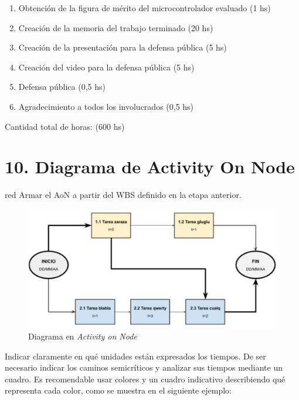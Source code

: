 \documentclass[
11pt, %
]{charter}
\begin{document}
\begin{enumerate}
\begin{enumerate}
		\item Obtención de la figura de mérito del microcontrolador evaluado (1 hs)
		\item Creación de la memoria del trabajo terminado (20 hs)
		\item Creación de la presentación para la defensa pública (5 hs)
		\item Creación del video para la defensa pública (5 hs)
		\item Defensa pública (0,5 hs)
		\item Agradecimiento a todos los involucrados (0,5 hs)
	\end{enumerate}
\end{enumerate}

Cantidad total de horas: (600 hs)

\section{10. Diagrama de Activity On Node}
\label{sec:AoN}

\begin{consigna}{red}
Armar el AoN a partir del WBS definido en la etapa anterior. 



\end{consigna}

\begin{figure}[htpb]
\centering 
\includegraphics[width=.8\textwidth]{./Figuras/AoN.png}
\caption{Diagrama en \textit{Activity on Node}}
\label{fig:AoN}
\end{figure}

Indicar claramente en qué unidades están expresados los tiempos.
De ser necesario indicar los caminos semicríticos y analizar sus tiempos mediante un cuadro.
Es recomendable usar colores y un cuadro indicativo describiendo qué representa cada color, como se muestra en el siguiente ejemplo:
\end{document}

